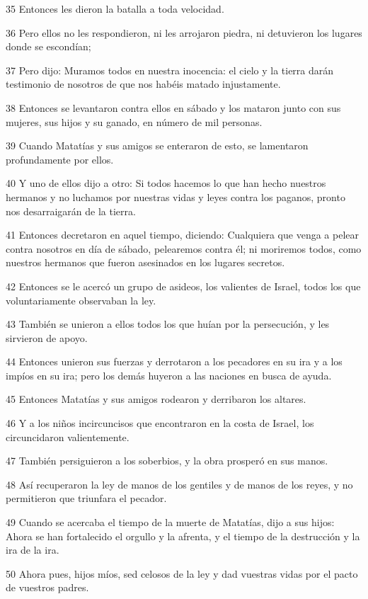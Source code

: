 \par 35 Entonces les dieron la batalla a toda velocidad.
\par 36 Pero ellos no les respondieron, ni les arrojaron piedra, ni detuvieron los lugares donde se escondían;
\par 37 Pero dijo: Muramos todos en nuestra inocencia: el cielo y la tierra darán testimonio de nosotros de que nos habéis matado injustamente.
\par 38 Entonces se levantaron contra ellos en sábado y los mataron junto con sus mujeres, sus hijos y su ganado, en número de mil personas.
\par 39 Cuando Matatías y sus amigos se enteraron de esto, se lamentaron profundamente por ellos.
\par 40 Y uno de ellos dijo a otro: Si todos hacemos lo que han hecho nuestros hermanos y no luchamos por nuestras vidas y leyes contra los paganos, pronto nos desarraigarán de la tierra.
\par 41 Entonces decretaron en aquel tiempo, diciendo: Cualquiera que venga a pelear contra nosotros en día de sábado, pelearemos contra él; ni moriremos todos, como nuestros hermanos que fueron asesinados en los lugares secretos.
\par 42 Entonces se le acercó un grupo de asideos, los valientes de Israel, todos los que voluntariamente observaban la ley.
\par 43 También se unieron a ellos todos los que huían por la persecución, y les sirvieron de apoyo.
\par 44 Entonces unieron sus fuerzas y derrotaron a los pecadores en su ira y a los impíos en su ira; pero los demás huyeron a las naciones en busca de ayuda.
\par 45 Entonces Matatías y sus amigos rodearon y derribaron los altares.
\par 46 Y a los niños incircuncisos que encontraron en la costa de Israel, los circuncidaron valientemente.
\par 47 También persiguieron a los soberbios, y la obra prosperó en sus manos.
\par 48 Así recuperaron la ley de manos de los gentiles y de manos de los reyes, y no permitieron que triunfara el pecador.
\par 49 Cuando se acercaba el tiempo de la muerte de Matatías, dijo a sus hijos: Ahora se han fortalecido el orgullo y la afrenta, y el tiempo de la destrucción y la ira de la ira.
\par 50 Ahora pues, hijos míos, sed celosos de la ley y dad vuestras vidas por el pacto de vuestros padres.

